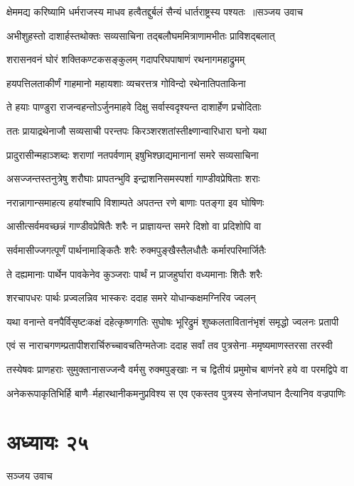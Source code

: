\threelineshloka
{क्षेममद्य करिष्यामि धर्मराजस्य माधव}
{हत्वैतद्दुर्बलं सैन्यं धार्तराष्ट्रस्य पश्यतः ॥सञ्जय उवाच}
{}


\twolineshloka
{अभीशुहस्तो दाशार्हस्तथोक्तः सव्यसाचिना}
{तद्बलौघममित्राणामभीतः प्राविशद्बलात्}


\twolineshloka
{शरासनवनं घोरं शक्तिकण्टकसङ्कुलम्}
{गदापरिघपाषाणं रथनागमहाद्रुमम्}


\twolineshloka
{हयपत्तिलताकीर्णं गाहमानो महायशाः}
{व्यचरत्तत्र गोविन्दो रथेनातिपताकिना}


\twolineshloka
{ते हयाः पाण्डुरा राजन्वहन्तोऽर्जुनमाहवे}
{दिक्षु सर्वास्वदृश्यन्त दाशार्हेण प्रचोदिताः}


\twolineshloka
{ततः प्रायाद्रथेनाजौ सव्यसाची परन्तपः}
{किरञ्शरशतांस्तीक्ष्णान्वारिधारा घनो यथा}


\twolineshloka
{प्रादुरासीन्महाञ्शब्दः शराणां नतपर्वणाम्}
{इषुभिश्छाद्यमानानां समरे सव्यसाचिना}


\twolineshloka
{असज्जन्तस्तनुत्रेषु शरौघाः प्रापतन्भुवि}
{इन्द्राशनिसमस्पर्शा गाण्डीवप्रेषिताः शराः}


\twolineshloka
{नरान्नागान्समाहत्य हयांश्चापि विशाम्पते}
{अपतन्त रणे बाणाः पतङ्गा इव घोषिणः}


\twolineshloka
{आसीत्सर्वमवच्छन्नं गाण्डीवप्रेषितैः शरैः}
{न प्राज्ञायन्त समरे दिशो वा प्रदिशोपि वा}


\twolineshloka
{सर्वमासीज्जगत्पूर्णं पार्थनामाङ्कितैः शरैः}
{रुक्मपुङ्खैस्तैलधौतैः कर्मारपरिमार्जितैः}


\twolineshloka
{ते दह्यमानाः पार्थेन पावकेनेव कुञ्जराः}
{पार्थं न प्राजहुर्घारा वध्यमानाः शितैः शरैः}


\twolineshloka
{शरचापधरः पार्थः प्रज्वलन्निव भास्करः}
{ददाह समरे योधान्कक्षमग्निरिव ज्वलन्}


\twolineshloka
{यथा वनान्ते वनपैर्विसृष्टःकक्षं दहेत्कृष्णगतिः सुघोषः}
{भूरिद्रुमं शुष्कलतावितानंभृशं समृद्धो ज्वलनः प्रतापी}


\twolineshloka
{एवं स नाराचगणम्प्रतापीशरार्चिरुच्चावचतिग्मतेजाः}
{ददाह सर्वां तव पुत्रसेना--ममृष्यमाणस्तरसा तरस्वी}


\twolineshloka
{तस्येषवः प्राणहराः सुमुक्तानासज्जन्वै वर्मसु रुक्मपुङ्खाः}
{न च द्वितीयं प्रमुमोच बाणंनरे हये वा परमद्विपे वा}


\twolineshloka
{अनेकरूपाकृतिभिर्हि बाणै--र्महारथानीकमनुप्रविश्य}
{स एव एकस्तव पुत्रस्य सेनांजघान दैत्यानिव वज्रपाणिः}


\chapter{अध्यायः २५}
\twolineshloka
{सञ्जय उवाच}
{}



